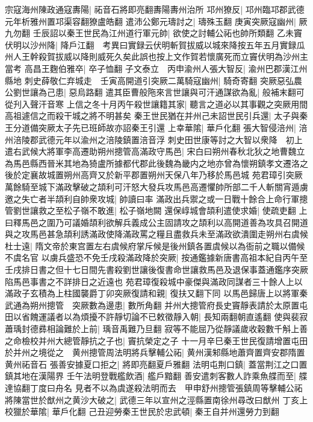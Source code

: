 宗寇海州陳政通寇夀陽|{
	祏音石將即亮翻夀陽夀州治所}
邛州獠反|{
	邛州臨邛郡武德元年析雅州置邛渠容翻獠盧皓翻}
遣沛公鄭元璹討之|{
	璹殊玉翻}
庚寅突厥寇幽州|{
	厥九勿翻}
壬辰詔以秦王世民為江州道行軍元帥|{
	欲使之討輔公祏也帥所類翻}
乙未竇伏明以沙州降|{
	降戶江翻　考異曰實録云伏明斬賀拔威以城來降按五年五月實録瓜州人王幹殺賀拔威以降則威死久矣此誤也按上文作賀若懷廣死而立竇伏明為沙州主當考}
高昌王麴伯雅卒|{
	卒子恤翻}
子文泰立　丙申渝州人張大智反|{
	渝州巴郡漢江州縣地}
刺史薛敬仁弃城走　壬寅高開道引突厥二萬騎寇幽州|{
	騎奇寄翻}
突厥惡弘農公劉世讓為己患|{
	惡烏路翻}
遣其臣曹般陁來言世讓與可汗通謀欲為亂|{
	般補末翻可從刋入聲汗音寒}
上信之冬十月丙午殺世讓籍其家|{
	聽言之道必以其事觀之突厥用間高祖遽信之而殺干城之將不明甚矣}
秦王世民猶在并州己未詔世民引兵還|{
	太子與秦王分道備突厥太子先已班師故亦詔秦王引還}
上幸華隂|{
	華戶化翻}
張大智侵涪州|{
	涪州涪陵郡武德元年以渝州之涪陵鎮置涪音浮}
刺史田世康等討之大智以衆降　初上遣右武候大將軍李高遷助朔州摠管高滿政守馬邑|{
	宋白曰朔州春秋北狄之地曹魏立為馬邑縣西晉米其地為猗盧所據都代郡此後魏為畿内之地亦曾為懷朔鎮孝文遷洛之後於定襄故城置朔州高齊又於新平郡置朔州天保八年乃移於馬邑城}
苑君璋引突厥萬餘騎至城下滿政擊破之頡利可汗怒大發兵攻馬邑高遷懼帥所部二千人斬關宵遁虜邀之失亡者半頡利自帥衆攻城|{
	帥讀曰率}
滿政出兵禦之或一日戰十餘合上命行軍摠管劉世讓救之至松子嶺不敢進|{
	松子嶺地闕}
還保崞城會頡利遣使求婚|{
	使疏吏翻}
上曰釋馬邑之圍乃可議婚頡利欲解兵義成公主固請攻之頡利以高開道善為攻具召開道與之攻馬邑甚急頡利誘滿政使降滿政罵之糧且盡救兵未至滿政欲潰圍走朔州右虞候杜士遠|{
	隋文帝於東宫置左右虞候府掌斥候是後州鎮各置虞候以為衙前之職以備候不虞名官}
以虜兵盛恐不免壬戌殺滿政降於突厥|{
	按通鑑據新唐書高祖本紀自丙午至壬戌排日書之但十七日間先書殺劉世讓後復書命世讓救馬邑及退保事蓋通鑑序突厥陷馬邑事書之不詳排日之近遠也}
苑君璋復殺城中豪傑與滿政同謀者三十餘人上以滿政子玄積為上柱國襲爵丁卯突厥復請和親|{
	復扶又翻下同}
以馬邑歸唐上以將軍秦武通為朔州摠管　突厥數為邊患|{
	數所角翻}
并州大摠管府長史竇靜表請於太原置屯田以省餽運議者以為煩擾不許靜切論不已敕徵靜入朝|{
	長知兩翻朝直遙翻}
使與裴寂蕭瑀封德彞相論難於上前|{
	瑀音禹難乃旦翻}
寂等不能屈乃從靜議歲收穀數千斛上善之命檢校并州大總管靜抗之子也|{
	竇抗榮定之子}
十一月辛巳秦王世民復請增置屯田於并州之境從之　黄州摠管周法明將兵擊輔公祏|{
	黄州漢邾縣地蕭齊置齊安郡隋置黄州祏音石}
張善安據夏口拒之|{
	將即亮翻夏戶雅翻}
法明屯荆口鎮|{
	蓋當荆江之口置鎮其地在漢陽界}
壬午法明登戰艦飲酒|{
	艦戶黯翻}
善安遣刺客數人詐乘魚艓而至|{
	艓達協翻丁度曰舟名}
見者不以為虞遂殺法明而去　甲申舒州摠管張鎮周等擊輔公祏將陳當世於猷州之黄沙大破之|{
	武德三年以宣州之涇縣置南徐州尋改曰猷州}
丁亥上校獵於華隂|{
	華戶化翻}
己丑迎勞秦王世民於忠武頓|{
	秦王自并州還勞力到翻}
